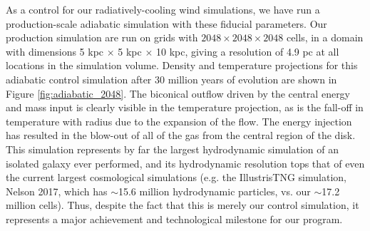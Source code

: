 \documentclass[11pt,letterpaper,english]{article}
\begin{document}
As a control for our radiatively-cooling wind simulations, we have run a production-scale adiabatic simulation with these fiducial parameters. Our production simulation are run on grids with $2048\times2048\times2048$ cells, in a domain with dimensions 5 kpc $\times$ 5 kpc $\times$ 10 kpc, giving a resolution of 4.9 pc at all locations in the simulation volume. Density and temperature projections for this adiabatic control simulation after 30 million years of evolution are shown in Figure \ref{fig:adiabatic_2048}. The biconical outflow driven by the central energy and mass input is clearly visible in the temperature projection, as is the fall-off in temperature with radius due to the expansion of the flow. The energy injection has resulted in the blow-out of all of the gas from the central region of the disk. This simulation represents by far the largest hydrodynamic simulation of an isolated galaxy ever performed, and its hydrodynamic resolution tops that of even the current largest cosmological simulations (e.g. the IllustrisTNG simulation, Nelson 2017, which has $\sim$15.6 million hydrodynamic particles, vs. our $\sim$17.2 million cells). Thus, despite the fact that this is merely our control simulation, it represents a major achievement and technological milestone for our program.
\end{document}
